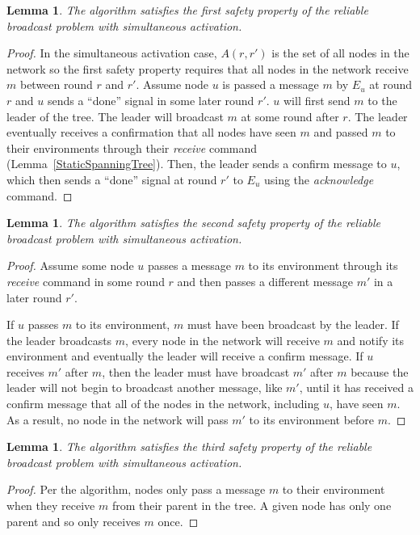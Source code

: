 \documentclass[english]{article}
\newtheorem{lemma}[theorem]{Lemma}
\begin{document}
\begin{lemma}
\label{StaticRBSafety1}
The algorithm satisfies the first safety property of the reliable broadcast problem with simultaneous activation.
\end{lemma}
\begin{proof}

In the simultaneous activation case, $A(r,r')$ is the set of all nodes in the network so the first safety property requires that all nodes in the network receive $m$ between round $r$ and $r'$. Assume node $u$ is passed a message $m$ by $E_u$ at round $r$ and $u$ sends  a ``done'' signal in some later round $r'$. $u$ will first send $m$ to the leader of the tree. The leader will broadcast $m$ at some round after $r$. The leader eventually receives a confirmation that all nodes have seen $m$ and passed $m$ to their environments through their \textit{receive} command (Lemma~\ref{StaticSpanningTree}). Then, the leader sends a confirm message to $u$, which then sends  a ``done'' signal at round $r'$ to $E_u$ using the \textit{acknowledge} command. 

\end{proof}


\begin{lemma}
\label{StaticRBSafety2}
The algorithm satisfies the second safety property of the reliable broadcast problem with simultaneous activation.
\end{lemma}
\begin{proof}

Assume some node $u$ passes a message $m$ to its environment through its \textit{receive} command in some round $r$ and then passes a different message $m'$ in a later round $r'$. 

If $u$ passes $m$ to its environment, $m$ must have been broadcast by the leader. If the leader broadcasts $m$, every node in the network will receive $m$ and notify its environment and eventually the leader will receive a confirm message. If $u$ receives $m'$ after $m$, then the leader must have broadcast $m'$ after $m$ because the leader will not begin to broadcast another message, like $m'$, until it has received a confirm message that all of the nodes in the network, including $u$, have seen $m$. As a result, no node in the network will pass $m'$ to its environment before $m$.

\end{proof}

\begin{lemma}
\label{StaticRBSafety3}
  The algorithm satisfies the third safety property of the reliable broadcast problem with simultaneous activation.
\end{lemma}
\begin{proof}

Per the algorithm, nodes only pass a message $m$ to their environment when they receive $m$ from their parent in the tree. A given node has only one parent and so only receives $m$ once.

\end{proof}
\end{document}
